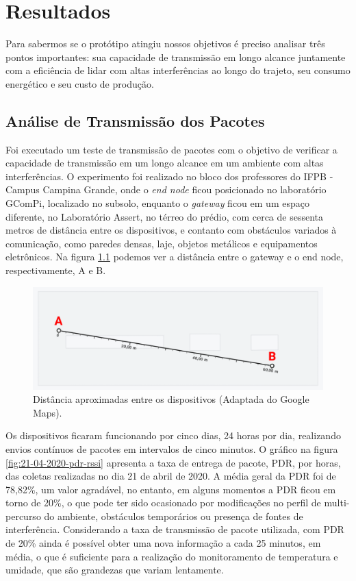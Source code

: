 \chapter{Resultados}
\label{cap:result}
Para sabermos se o protótipo atingiu nossos objetivos é preciso analisar três pontos importantes: sua capacidade de transmissão em longo alcance juntamente com a eficiência de lidar com altas interferências ao longo do trajeto, seu consumo energético e seu custo de produção.

\section{Análise de Transmissão dos Pacotes}
\label{result:transmissao}
Foi executado um teste de transmissão de pacotes com o objetivo de verificar a capacidade de transmissão em um longo alcance em um ambiente com altas interferências. O experimento foi realizado no bloco dos professores do IFPB - Campus Campina Grande, onde o \textit{end node} ficou posicionado no laboratório GComPi, localizado no subsolo, enquanto o \textit{gateway} ficou em um espaço diferente, no Laboratório Assert, no térreo do prédio, com cerca de sessenta metros de distância entre os dispositivos, e contanto com obstáculos variados à comunicação, como paredes densas, laje, objetos metálicos e equipamentos eletrônicos. Na figura \ref{fig:experiment-01} podemos ver a distância entre o gateway e o end node, respectivamente, A e B.

\begin{figure}[H]
  \centering
  \includegraphics[width=.80\textwidth]{assets/experiment-01.png} 
  \caption{Distância aproximadas entre os dispositivos (Adaptada do Google Maps).}
  \label{fig:experiment-01} 
\end{figure}

Os dispositivos ficaram funcionando por cinco dias, 24 horas por dia, realizando envios contínuos de pacotes em intervalos de cinco minutos. O gráfico na figura \ref{fig:21-04-2020-pdr-rssi} apresenta a taxa de entrega de pacote, PDR, por horas, das coletas realizadas no dia 21 de abril de 2020. A média geral da PDR foi de 78,82\%, um valor agradável, no entanto, em alguns momentos a PDR ficou em torno de 20\%, o que pode ter sido ocasionado por modificações no perfil de multi-percurso do ambiente, obstáculos temporários ou presença de fontes de interferência. Considerando a taxa de transmissão de pacote utilizada, com PDR de 20\% ainda é possível obter uma nova informação a cada 25 minutos, em média, o que é suficiente para a realização do monitoramento de temperatura e umidade, que são grandezas que variam lentamente.

